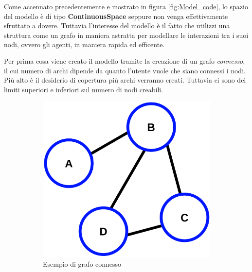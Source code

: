 Come accennato precedentemente e mostrato in figura \ref{fig:Model_code}, lo spazio del modello 
è di tipo \textbf{ContinuousSpace} seppure non venga effettivamente sfruttato a dovere. 
Tuttavia l'interesse del modello è il fatto che utilizzi una struttura come un grafo in maniera
astratta per modellare le interazioni tra i suoi nodi, ovvero gli agenti, in maniera rapida ed efficente.

Per prima cosa viene creato il modello tramite la creazione di un grafo \emph{connesso}, il cui 
numero di archi dipende da quanto l'utente vuole che siano connessi i nodi. Più alto è il 
desiderio di copertura più archi verranno creati. Tuttavia ci sono dei limiti superiori e inferiori 
sul numero di nodi creabili.

\begin{figure}[!hb]
	\centering
	\begin{subfigure}[b]{0.45\textwidth}
		\centering
		\includegraphics[width=\textwidth]{img/CPT-Graphs-undirected-unweighted-ex1.svg.png}
		\caption{Esempio di grafo connesso}
		\label{fig:connected_graph_example}
	\end{subfigure}
	\hfill
	\begin{subfigure}[b]{0.45\textwidth}
		\centering

\end{subfigure}
\end{figure}
